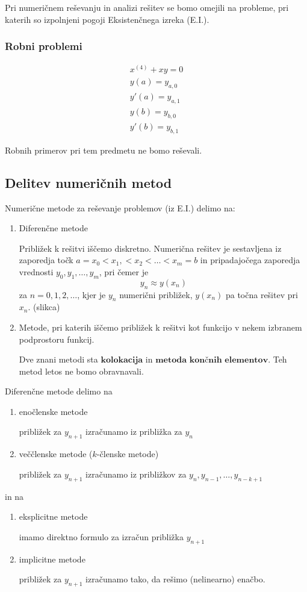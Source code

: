 \documentclass[a4paper,12pt]{article}
\theoremstyle{definition}
\theoremstyle{remark}
\begin{document}
Pri numeričnem reševanju in analizi rešitev se bomo omejili na probleme, pri katerih so izpolnjeni pogoji Eksistenčnega izreka (E.I.).

\subsubsection{Robni problemi}

\begin{gather*}
    x^{(4)} + xy = 0 \\
    y(a) = y_{a, 0} \\
    y'(a) = y_{a, 1} \\
    y(b) = y_{b, 0} \\
    y'(b) = y_{b, 1}
\end{gather*}

Robnih primerov pri tem predmetu ne bomo reševali.

\subsection{Delitev numeričnih metod}

Numerične metode za reševanje problemov (iz E.I.) delimo na:

\begin{enumerate}
    \item Diferenčne metode
    
    Približek k rešitvi iščemo diskretno. Numerična rešitev je sestavljena iz zaporedja točk $a = x_0 < x_1, < x_2 < \dots < x_m = b$ in pripadajočega
    zaporedja vrednosti $y_0, y_1, \dots, y_m$, pri čemer je 
    \begin{equation*}
        y_n \approx y(x_n)
    \end{equation*}
    za $n = 0, 1, 2, \dots$, kjer je $y_n$ numerični približek, $y(x_n)$ pa točna rešitev pri $x_n$.
    (slikca)
    \item Metode, pri katerih iščemo približek k rešitvi kot funkcijo v nekem izbranem podprostoru funkcij.
    
    Dve znani metodi sta $\textbf{kolokacija}$ in $\textbf{metoda končnih elementov}$. Teh metod letos ne bomo obravnavali.
\end{enumerate}


Diferenčne metode delimo na
\begin{enumerate}
    \item enočlenske metode
    
    približek za $y_{n+1}$ izračunamo iz približka za $y_n$
    \item veččlenske metode ($k$-členske metode)
    
    približek za $y_{n+1}$ izračunamo iz približkov za $y_n, y_{n-1}, \dots, y_{n-k+1}$
\end{enumerate}
in na
\begin{enumerate}
    \item eksplicitne metode
    
    imamo direktno formulo za izračun približka $y_{n+1}$
    \item implicitne metode
    
    približek za $y_{n+1}$ izračunamo tako, da rešimo (nelinearno) enačbo.
\end{enumerate}
\end{document}
